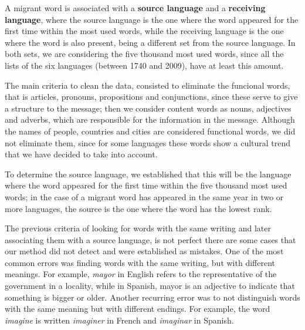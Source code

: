 \documentclass[10pt,letterpaper]{article} %
\begin{document}
	A migrant word is associated with a \textbf{source language} and a
	\textbf{receiving language}, where the source language is the one where the
	word appeared for the first time within the most used words,
	while the receiving language is the one where the word is also present, being a
	different set from the source language. In both sets, we are considering the five thousand most used words, since all the lists of the six languages (between 1740 and 2009), have at least this amount.  
	
	The main criteria to clean the data, consisted to eliminate the funcional words, that is articles, pronouns, propositions and conjunctions, since these serve to give a structure to the message;  then we consider content words as nouns, adjectives and adverbs, which are responsible for the information in the message. Although the names of people, countries and cities are considered functional words, we did not eliminate them, since for some languages these words show a cultural trend that we have decided to take into account.
	
	To determine the source language, we established that this will be the language where the word appeared for the first time within the five thousand most used words; in the case of a migrant word has appeared in the same year in two or more languages, the source is the one where the word has the lowest rank.
	
	
	
	
	The previous criteria of looking for words with the same writing and later
	associating them with a source language, is not perfect there are some cases that our method did not detect and were established as mistakes. One of the most common errors was finding words with the same writing, but with different meanings. For example,  \textit{mayor} in English refers to the representative of the government in a locality, while in Spanish,  mayor is an adjective to indicate that something
	is bigger or older.  Another recurring error was to not distinguish words with the same meaning but with different endings. For example, the word \textit{imagine} is written \textit{imaginer} in French and \textit{imaginar} in Spanish.
	
\end{document}
